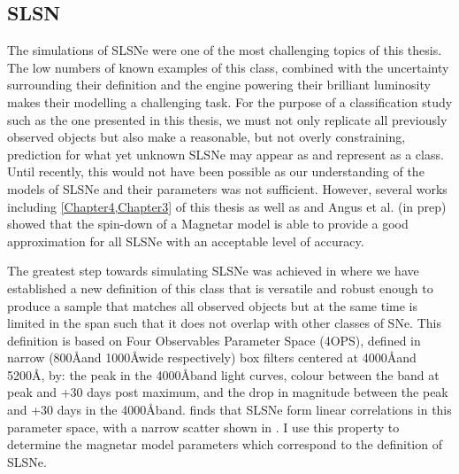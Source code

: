 \subsection{SLSN}
The simulations of SLSNe were one of the most challenging topics of this thesis. The low numbers of known examples of this class, combined with the uncertainty surrounding their definition and the engine powering their brilliant luminosity makes their modelling a challenging task. For the purpose of a classification study such as the one presented in this thesis, we must not only replicate all previously observed objects but also make a reasonable, but not overly constraining, prediction for what yet unknown SLSNe may appear as and represent as a class. Until recently, this would not have been possible as our understanding of the models of SLSNe and their parameters was not sufficient. However, several works including \cref{Chapter4,Chapter3} of this thesis as well as \citet{Inserra2013,Nicoll2013,Nicoll2017} and Angus et al. (in prep) showed that the spin-down of a Magnetar model is able to provide a good approximation for all SLSNe with an acceptable level of accuracy.

The greatest step towards simulating SLSNe was achieved in \citet{Inserra2018a} where we have established a new definition of this class that is versatile and robust enough to produce a sample that matches all observed objects but at the same time is limited in the span such that it does not overlap with other classes of SNe. This definition is based on Four Observables Parameter Space (4OPS), defined in narrow (800\AA and 1000\AA wide respectively) box filters centered at 4000\AA and 5200\AA, by: the peak in the 4000\AA band light curves, colour between the band at peak and +30 days post maximum, and the drop in magnitude between the peak and +30 days in the 4000\AA band. \citet{Inserra2018a} finds that SLSNe form linear correlations in this parameter space, with a narrow scatter shown in . I use this property to determine the magnetar model parameters which correspond to the definition of SLSNe.

